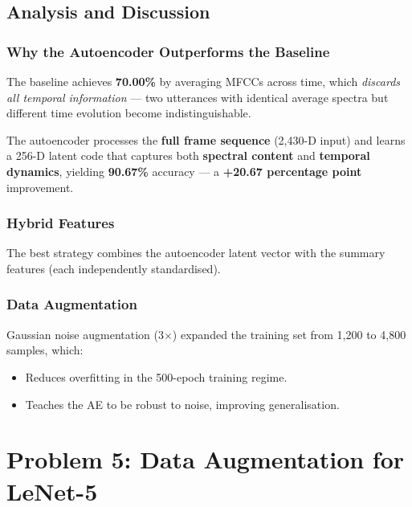 \documentclass[12pt, a4paper]{article}
\begin{document}
\subsection{Analysis and Discussion}

\subsubsection{Why the Autoencoder Outperforms the Baseline}

The baseline achieves \textbf{70.00\%} by averaging MFCCs across time, which
\emph{discards all temporal information} --- two utterances with identical average
spectra but different time evolution become indistinguishable.

The autoencoder processes the \textbf{full frame sequence} (2{,}430-D input) and
learns a 256-D latent code that captures both \textbf{spectral content} and
\textbf{temporal dynamics}, yielding \textbf{90.67\%} accuracy --- a
\textbf{+20.67 percentage point} improvement.

\subsubsection{Hybrid Features}

The best strategy combines the autoencoder latent vector with the summary features
(each independently standardised).

\subsubsection{Data Augmentation}

Gaussian noise augmentation (3$\times$) expanded the training set from
1{,}200 to 4{,}800 samples, which:
\begin{itemize}
    \item Reduces overfitting in the 500-epoch training regime.
    \item Teaches the AE to be robust to noise, improving generalisation.
\end{itemize}

\newpage

\section{Problem 5: Data Augmentation for LeNet-5}
\end{document}
